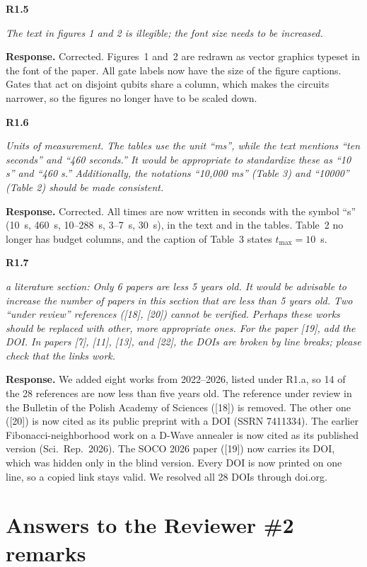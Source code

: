 \documentclass[11pt]{article}
\newenvironment{rc}[1]{\par\medskip\noindent\textbf{#1}\par\nopagebreak\noindent\itshape\ignorespaces}{\par}
\newcommand{\answer}[1]{\par\smallskip\noindent\textbf{Response.} #1\par}
\begin{document}
\begin{rc}{R1.5}
The text in figures 1 and 2 is illegible; the font size needs to be increased.
\end{rc}
\answer{Corrected. Figures~1 and~2 are redrawn as vector graphics typeset in the font of the paper. All gate labels now have the size of the figure captions. Gates that act on disjoint qubits share a column, which makes the circuits narrower, so the figures no longer have to be scaled down.}

\begin{rc}{R1.6}
Units of measurement. The tables use the unit ``ms'', while the text mentions ``ten seconds'' and ``460 seconds.'' It would be appropriate to standardize these as ``10 s'' and ``460 s.'' Additionally, the notations ``10,000 ms'' (Table 3) and ``10000'' (Table 2) should be made consistent.
\end{rc}
\answer{Corrected. All times are now written in seconds with the symbol ``s'' (10~s, 460~s, 10--288~s, 3--7~s, 30~s), in the text and in the tables. Table~2 no longer has budget columns, and the caption of Table~3 states $t_{\max}=10$~s.}

\begin{rc}{R1.7}
a literature section: Only 6 papers are less 5 years old. It would be advisable to increase the number of papers in this section that are less than 5 years old. Two ``under review'' references ([18], [20]) cannot be verified. Perhaps these works should be replaced with other, more appropriate ones. For the paper [19], add the DOI. In papers [7], [11], [13], and [22], the DOIs are broken by line breaks; please check that the links work.
\end{rc}
\answer{We added eight works from 2022--2026, listed under R1.a, so 14 of the 28 references are now less than five years old. The reference under review in the Bulletin of the Polish Academy of Sciences ([18]) is removed. The other one ([20]) is now cited as its public preprint with a DOI (SSRN 7411334). The earlier Fibonacci-neighborhood work on a D-Wave annealer is now cited as its published version (Sci.\ Rep.\ 2026). The SOCO 2026 paper ([19]) now carries its DOI, which was hidden only in the blind version. Every DOI is now printed on one line, so a copied link stays valid. We resolved all 28 DOIs through doi.org.}

\section*{Answers to the Reviewer \#2 remarks}
\end{document}
